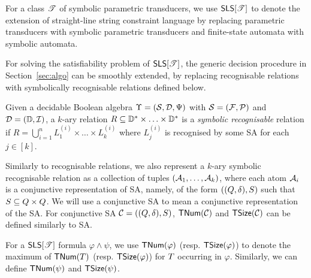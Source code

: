 For a class $\mathscr{T}$ of symbolic parametric transducers, we use $\textsf{SLS}[\mathscr{T}]$ to denote the extension of straight-line string constraint language by replacing parametric transducers with symbolic parametric transducers and finite-state automata with symbolic automata.

For solving the satisfiability problem of $\textsf{SLS}[\mathscr{T}]$, the generic decision procedure in Section~\ref{sec:algo} can be smoothly extended, by replacing recognisable relations with symbolically recognisable relations defined below.

\begin{definition}
	Given a decidable Boolean algebra $\Upsilon=(\mathcal{S}, \mathcal{D}, \Psi)$ with $\mathcal{S} = ({\mathcal{F}}, {\mathcal{P}})$ and $\mathcal{D} = (\mathbb{D}, \mathcal{I})$, a $k$-ary relation $R \subseteq \mathbb{D}^*\times \ldots\times \mathbb{D}^*$ is a \emph{symbolic recognisable} relation if $R=\bigcup_{i=1}^n L^{(i)}_1 \times \ldots \times L^{(i)}_k$ where $L^{(i)}_j$ is recognised by some SA for each $j\in [k]$.
\end{definition}
Similarly to recognisable relations, we also represent a  $k$-ary symbolic recognisable relation as a collection of tuples $(\mathcal{A}_1, \ldots, \mathcal{A}_k)$, where each atom $\mathcal{A}_i$ is a conjunctive representation of SA, namely, of the form $((Q, \delta), S)$ such that $S \subseteq Q \times Q$. We will use a conjunctive SA to mean a conjunctive representation of the SA. For conjunctive SA $\mathcal{C}= ((Q, \delta), S)$, $\mathsf{TNum}(\mathcal{C})$ and $\mathsf{TSize}(\mathcal{C})$ can be defined similarly to SA.

For a $\textsf{SLS}[\mathscr{T}]$ formula $\varphi \wedge \psi$, we use $\mathsf{TNum}(\varphi)$ (resp. $\mathsf{TSize}(\varphi)$) to denote the maximum of $\mathsf{TNum}(T)$ (resp. $\mathsf{TSize}(\varphi)$) for $T$ occurring in $\varphi$. Similarly, we can define $\mathsf{TNum}(\psi)$ and $\mathsf{TSize}(\psi)$.


